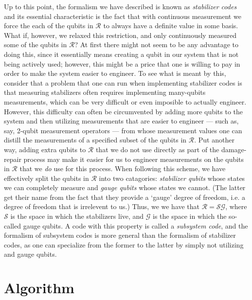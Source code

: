 \documentclass[twocolumn,showpacs,preprintnumbers,amsmath,amssymb,nofootinbib,pra,floatfix]{revtex4}
\begin{document}
Up to this point, the formalism we have described is known as \emph{stabilizer codes} and its essential characteristic is the fact that with continuous measurement we force the each of the qubits in $\mathscr{R}$ to always have a definite value in some basis.  What if, however, we relaxed this restriction, and only continuously measured some of the qubits in $\mathscr{R}$?  At first there might not seem to be any advantage to doing this, since it essentially means creating a qubit in our system that is not being actively used;  however, this might be a price that one is willing to pay in order to make the system easier to engineer.  To see what is meant by this, consider that a problem that one can run when implementing stabilizer codes is that measuring stabilizers often requires implementing many-qubits measurements, which can be very difficult or even imposible to actually engineer.  However, this difficulty can often be circumvented by adding more qubits to the system and then utilizing measurements that are easier to engineer --- such as, say, 2-qubit measurement operators --- from whose measurement values one can distill the measurements of a specified subset of the qubits in $\mathscr{R}$.  Put another way, adding extra qubits to $\mathscr{R}$ that we do not use directly as part of the damage-repair process may make it easier for us to engineer measurements on the qubits in $\mathscr{R}$ that we \emph{do} use for this process.  When following this scheme, we have effectively split the qubits in $\mathscr{R}$ into two catagories:  \emph{stabilizer qubits} whose states we can completely measure and \emph{gauge qubits} whose states we cannot.  (The latter get their name from the fact that they provide a `gauge' degree of freedom, i.e. a degree of freedom that is irrelevent to us.)  Thus, we we have that $\mathscr{R}=\mathscr{S}\mathscr{G}$, where $\mathscr{S}$ is the space in which the stabilizers live, and $\mathscr{G}$ is the space in which the so-called gauge qubits.  A code with this property is called a \emph{subsystem code}, and the formalism of subsystem codes is more general than the formalism of stabilizer codes, as one can specialize from the former to the latter by simply not utilizing and gauge qubits.

\section{Algorithm}
\end{document}
